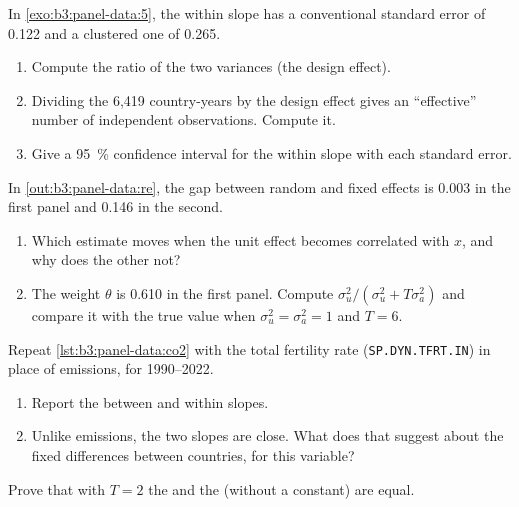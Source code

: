 \begin{exercise}[$\star\star$]\label{exo:b3:panel-data:7}
In \cref{exo:b3:panel-data:5}, the within slope has a conventional standard
error of 0.122 and a clustered one of 0.265.
\begin{enumerate}
\item Compute the ratio of the two variances (the design effect).
\item Dividing the 6{,}419 country-years by the design effect gives an
``effective'' number of independent observations. Compute it.
\item Give a 95~\% confidence interval for the within slope with each standard
error.
\end{enumerate}
\end{exercise}

\begin{exercise}[$\star\star$]\label{exo:b3:panel-data:8}
In \cref{out:b3:panel-data:re}, the gap between random and fixed effects is
0.003 in the first panel and 0.146 in the second.
\begin{enumerate}
\item Which estimate moves when the unit effect becomes correlated with $x$, and
why does the other not?
\item The weight $\theta$ is 0.610 in the first panel. Compute
$\sigma_u^2/(\sigma_u^2 + T\sigma_a^2)$ and compare it with the true value
when $\sigma_u^2 = \sigma_a^2 = 1$ and $T = 6$.
\end{enumerate}
\end{exercise}

\begin{exercise}[$\star\star$]\label{exo:b3:panel-data:9}
Repeat \cref{lst:b3:panel-data:co2} with the total fertility rate
(\texttt{SP.DYN.TFRT.IN}) in place of emissions, for 1990--2022.
\begin{enumerate}
\item Report the between and within slopes.
\item Unlike emissions, the two slopes are close. What does that suggest about
the fixed differences between countries, for this variable?
\end{enumerate}
\end{exercise}

\begin{exercise}[$\star\star\star$]\label{exo:b3:panel-data:10}
Prove that with $T = 2$ the  and the 
(without a constant) are equal.
\end{exercise}

